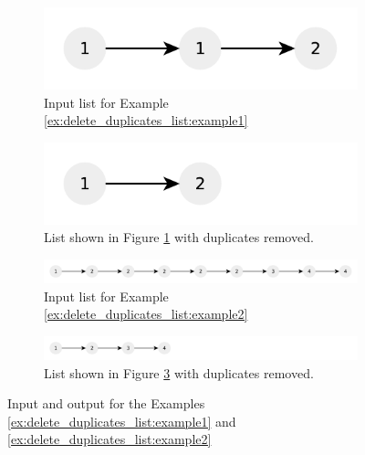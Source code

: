 \begin{figure}
	\centering
	\begin{subfigure}[t]{0.45\textwidth}
		\includegraphics[width=1\linewidth]{sources/delete_duplicates_list/images/example1_1}
		\caption{Input list for Example \ref{ex:delete_duplicates_list:example1}}
		\label{fig:delete_duplicates_list:example1_1}
	 \end{subfigure}
	\hfill
	\begin{subfigure}[t]{0.45\textwidth}
		\includegraphics[width=1\linewidth]{sources/delete_duplicates_list/images/example1_2}
		\caption{List shown in Figure \ref{fig:delete_duplicates_list:example1_1} with duplicates removed.}
		\label{fig:delete_duplicates_list:example1_2}
	 \end{subfigure}
	 \hfill
	 \begin{subfigure}[t]{0.99\textwidth}
		\includegraphics[width=1\linewidth]{sources/delete_duplicates_list/images/example2_1}
		\caption{Input list for Example \ref{ex:delete_duplicates_list:example2}}
		\label{fig:delete_duplicates_list:example2_1}
	 \end{subfigure}
	  \hfill
	  \begin{subfigure}[t]{0.99\textwidth}
		  \includegraphics[width=1\linewidth]{sources/delete_duplicates_list/images/example2_2}
		  \caption{List shown in Figure \ref{fig:delete_duplicates_list:example2_1} with duplicates removed.}
		  \label{fig:delete_duplicates_list:example2_2}
	   \end{subfigure}
	 \caption[]{Input and output for the Examples \ref{ex:delete_duplicates_list:example1} and \ref{ex:delete_duplicates_list:example2}}
	  \label{fig:delete_duplicates_list:example1}
\end{figure}



